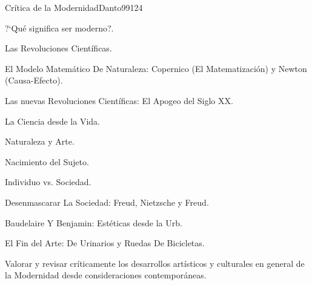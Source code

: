 \begin{syllabus}
\begin{competences}
    \item {}
    \item {}
    \item {}
    \item {}
\end{competences}

\begin{unit}{Crítica de la Modernidad}{}{Danto99}{12}{4}
   \begin{topics}
      \item ?`Qué significa ser moderno?.
      \item Las Revoluciones Científicas.
      \item El Modelo Matemático De Naturaleza: Copernico (El Matematización) y Newton (Causa-Efecto).
      \item Las nuevas Revoluciones Científicas: El Apogeo del Siglo XX.
      \item La Ciencia desde la Vida.
      \item Naturaleza y Arte.
      \item Nacimiento del Sujeto.
      \item Individuo vs. Sociedad.
      \item Desenmascarar La Sociedad: Freud, Nietzsche y Freud.
      \item Baudelaire Y Benjamin: Estéticas desde la Urb.
      \item El Fin del Arte: De Urinarios y Ruedas De Bicicletas.
   \end{topics}
   \begin{learningoutcomes}
      \item Valorar y revisar críticamente los desarrollos artísticos y culturales en general de la Modernidad desde consideraciones contemporáneas.
   \end{learningoutcomes}
\end{unit}



\begin{coursebibliography}
\end{coursebibliography}

\end{syllabus}

